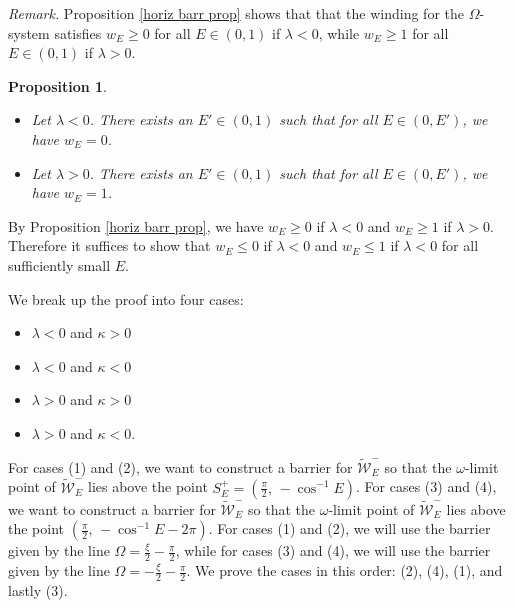 \documentclass[11 pt]{article}
\newtheorem{prop}[thm]{Proposition}%
\renewcommand\l{\lambda}
\renewcommand\({\left(}
\renewcommand\){\right)}
\newcommand\wt{\widetilde}
\newcommand\<{\langle}
\renewcommand\>{\rangle}
\renewcommand\l{\lambda}
\newcommand\8{\infty}
\newcommand{\mc}{\mathcal}
\begin{document}
\medskip
\medskip

\noindent\emph{Remark.} Proposition \ref{horiz barr prop} shows that that the winding for the $\Omega$-system satisfies $w_E \geq 0$ for all $E \in (0,1)$ if $\l < 0$, while $w_E \geq 1$ for all $E \in (0,1)$ if $\l > 0$. 


\medskip
\medskip

\begin{prop}\label{Omega winding leq 0 prop}\: $\phantom{nix}$
\begin{itemize}
\item[$\bullet$] Let $\l < 0$. There exists an $E' \in (0,1)$ such that for all $E \in (0, E')$, we have $w_E = 0$.
\item[$\bullet$] Let $\l > 0$. There exists an $E' \in (0,1)$ such that for all $E \in (0, E')$, we have $w_E = 1$.
\end{itemize}
\end{prop}


\proof
By Proposition \ref{horiz barr prop}, we have $w_E \geq 0$ if $\l < 0$ and $w_E \geq 1$ if $\l > 0$. Therefore it suffices to show that $w_E \leq 0$ if $\l < 0$ and $w_E \leq 1$ if $\l < 0$ for all sufficiently small $E$. 

We break up the proof into four cases:

\begin{itemize}
\item[(1)] $\lambda < 0$ and $\kappa > 0$
\item[(2)] $\lambda < 0$ and $\kappa < 0$
\item[(3)] $\lambda > 0$ and $\kappa > 0$
\item[(4)] $\lambda > 0$ and $\kappa < 0$. 
\end{itemize}



For cases (1) and (2), we want to construct a barrier for $\wt{\mc{W}}^-_E$ so that the $\omega$-limit point of $\wt{\mc{W}}^-_E$ lies above the point $S^+_E = (\frac{\pi}{2},\, -\cos^{-1}E)$. For cases (3) and (4), we want to construct a barrier for $\wt{\mc{W}}^-_E$ so that the $\omega$-limit point of $\wt{\mc{W}}^-_E$ lies above the point $(\frac{\pi}{2},\, - \cos^{-1}E-2\pi)$. For cases (1) and (2), we will use the barrier given by the line $\Omega = \frac{\xi}{2}-\frac{\pi}{2}$, while for cases (3) and (4), we will use the barrier given by the line $\Omega = -\frac{\xi}{2} -\frac{\pi}{2}$. We prove the cases in this order: (2), (4), (1), and lastly (3). 
\end{document}
